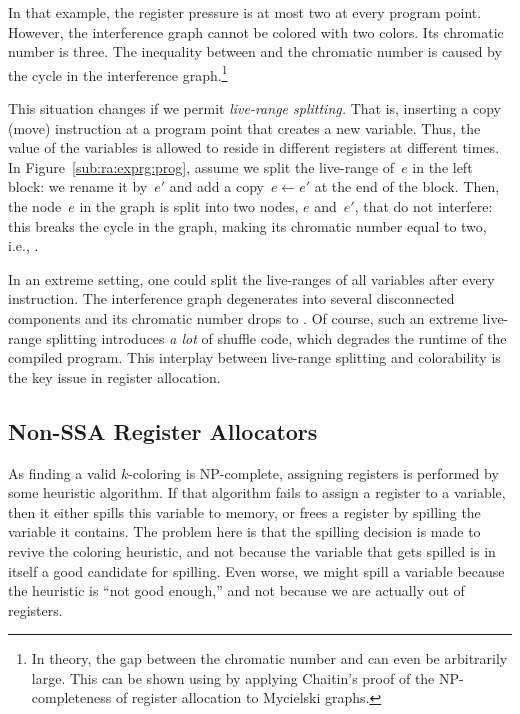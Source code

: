{In that example, the register pressure is at most two at every program point.
However, the interference graph cannot be colored with two colors. 
Its chromatic number is three.
The inequality between \maxlive and the chromatic number is caused by the cycle in the interference graph.\footnote{
In theory, the gap between the chromatic number and \maxlive can even be arbitrarily large.
This can be shown using by applying Chaitin's proof of the NP-completeness of register allocation to Mycielski graphs.}

This situation changes if we permit \emph{live-range splitting.} That is, inserting a copy (move) instruction at a program point that creates a new variable.
Thus, the value of the variables is allowed to reside in different registers at different times.
In Figure~\ref{sub:ra:exprg:prog}, assume we split the live-range of~$e$ in the left block: we rename it by~$e'$ and add a copy~$e \gets e'$ at the end of the block.
Then, the node~$e$ in the graph is split into two nodes, $e$ and~$e'$, that do not interfere: this breaks the cycle in the graph, making its chromatic number equal to two, i.e., \maxlive.


In an extreme setting, one could split the live-ranges of all variables after every instruction.
The interference graph degenerates into several disconnected components and its chromatic number drops to \maxlive.
Of course, such an extreme live-range splitting introduces \emph{a lot} of shuffle code, which degrades the runtime of the compiled program.
This interplay between live-range splitting and colorability is the key issue in register allocation.

\subsection{Non-SSA Register Allocators}
As finding a valid $k$-coloring is NP-complete, assigning registers is performed by some heuristic algorithm.
If that algorithm fails to assign a register to a variable, then it either spills this variable to memory, or frees a register by spilling the variable it contains.
The problem here is that the spilling decision is made to revive the coloring heuristic, and not because the variable that gets spilled is in itself a good candidate for spilling. 
Even worse, we might spill a variable because the heuristic is ``not good enough,'' and not because we are actually out of registers.

}
